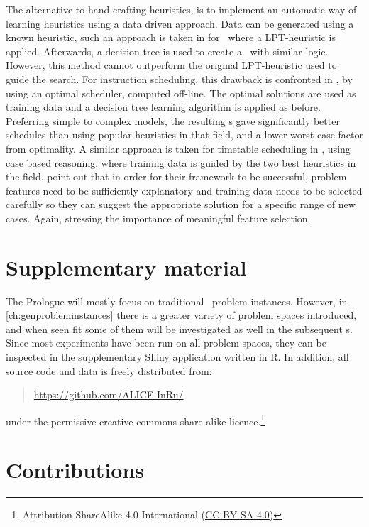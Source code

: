 The alternative to hand-crafting heuristics, is to implement an automatic way of learning heuristics using a data driven approach. %
Data can be generated using a known heuristic, such an approach is taken in 
\cite{Siggi05} for \jsp\, where a LPT-heuristic is applied. Afterwards, a 
decision tree is used to create a \dr\ with similar logic. However, this method 
cannot outperform the original LPT-heuristic used to guide the search. For 
instruction scheduling, this drawback is confronted in 
\citet{Malik08,Russell09,Siggi10}, by using an optimal scheduler, computed 
off-line. The optimal solutions are used as training data and a decision tree 
learning algorithm is applied as before. Preferring simple to complex models, 
the resulting \dr s gave significantly better schedules than using popular 
heuristics in that field, and a lower worst-case factor from optimality. A 
similar approach is taken for timetable scheduling in \cite{Burke06}, using 
case based reasoning, where training data is guided by the two best heuristics 
in the field. 
\citeauthor{Burke06} point out that in order for their framework to be 
successful, problem features need to be sufficiently explanatory and training 
data needs to be selected carefully so they can suggest the appropriate 
solution for a specific range of new cases. 
Again, stressing the importance of meaningful feature selection. 

\section{Supplementary material}
The Prologue will mostly focus on traditional \jsp\ problem instances. 
However, in \cref{ch:genprobleminstances} there is a greater variety of problem 
spaces introduced, and when seen fit some of them will be investigated as well 
in the subsequent s. 
Since most experiments have been run on all problem spaces, they can be 
inspected in the supplementary \href{http://tgax89.rhi.hi.is:3838/alice}{Shiny 
application written in R}. 
In addition, all source code and data is freely distributed from:
\begin{quote}
    \url{https://github.com/ALICE-InRu/}
\end{quote}
under the permissive creative commons share-alike 
licence.\footnote{Attribution-ShareAlike 4.0 International 
(\href{http://creativecommons.org/licenses/by-sa/4.0/}{CC BY-SA 4.0})}

\section{Contributions}

